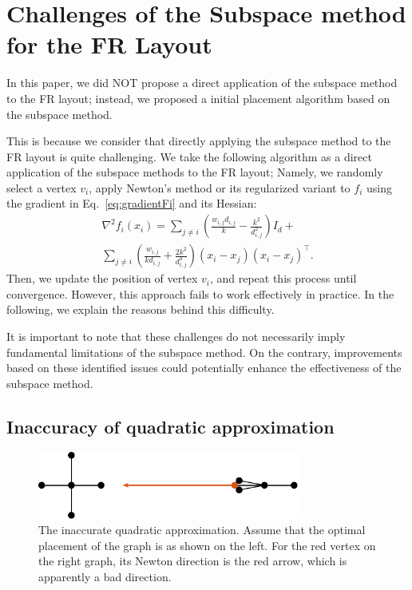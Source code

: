 \documentclass[dvipdfmx,journal]{IEEEtran}
\begin{document}
\section{Challenges of the Subspace method for the FR Layout}\label{sec:problemOfSubspace}

In this paper, we did NOT propose a direct application of the subspace method to the FR layout; instead, we proposed a initial placement algorithm based on the subspace method.

This is because we consider that directly applying the subspace method to the FR layout is quite challenging.
We take the following algorithm as a direct application of the subspace methods to the FR layout; Namely, we randomly select a vertex $v_i$, apply Newton's method or its regularized variant to $f_i$ using the gradient in Eq.~\ref{eq:gradientFi} and its Hessian:
\begin{gather*}
  \nabla^2 f_i(x_i) = \sum_{j \neq i} \left(\frac{w_{i,j}d_{i,j}}{k} - \frac{k^2}{d_{i,j}^2}\right) I_d + \\
  \sum_{j \neq i} \left(\frac{w_{i,j}}{k d_{i,j}} + \frac{2k^2}{d_{i,j}^4}\right) (x_i - x_j)(x_i - x_j)^\top.
\end{gather*}
Then, we update the position of vertex $v_i$, and repeat this process until convergence.
However, this approach fails to work effectively in practice. In the following, we explain the reasons behind this difficulty.

It is important to note that these challenges do not necessarily imply fundamental limitations of the subspace method. On the contrary, improvements based on these identified issues could potentially enhance the effectiveness of the subspace method.

\subsection{Inaccuracy of quadratic approximation}\label{ssec:inaccuracy}

\begin{figure}[t]
  \centering
  \includegraphics[height=2.2cm]{whyRSNfail/whyRSNfail.pdf}
  \caption{
    The inaccurate quadratic approximation.
    Assume that the optimal placement of the graph is as shown on the left.
    For the red vertex on the right graph, its Newton direction is the red arrow, which is apparently a bad direction.
  }
  \label{fig:whyRSNfail}
\end{figure}
\end{document}
